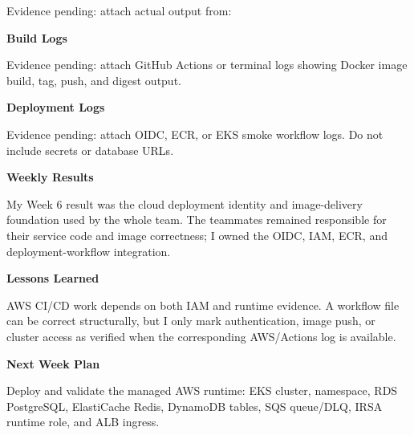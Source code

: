Evidence pending: attach actual output from:

\begin{Shaded}
\begin{Highlighting}[]
\end{Highlighting}
\end{Shaded}

\vspace{0.5em}\noindent\textbf{Build Logs}\par

Evidence pending: attach GitHub Actions or terminal logs showing Docker
image build, tag, push, and digest output.

\vspace{0.5em}\noindent\textbf{Deployment Logs}\par

Evidence pending: attach OIDC, ECR, or EKS smoke workflow logs. Do not
include secrets or database URLs.

\vspace{0.5em}\noindent\textbf{Weekly Results}\par

My Week 6 result was the cloud deployment identity and image-delivery
foundation used by the whole team. The teammates remained responsible
for their service code and image correctness; I owned the OIDC, IAM,
ECR, and deployment-workflow integration.

\vspace{0.5em}\noindent\textbf{Lessons Learned}\par

AWS CI/CD work depends on both IAM and runtime evidence. A workflow file
can be correct structurally, but I only mark authentication, image push,
or cluster access as verified when the corresponding AWS/Actions log is
available.

\vspace{0.5em}\noindent\textbf{Next Week Plan}\par

Deploy and validate the managed AWS runtime: EKS cluster, namespace, RDS
PostgreSQL, ElastiCache Redis, DynamoDB tables, SQS queue/DLQ, IRSA
runtime role, and ALB ingress.
